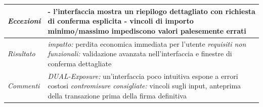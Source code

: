 \begin{longtable}{| >{\columncolor{misuseCol}}p{} | p{} |}
\hline
\textit{Eccezioni} & - l'interfaccia mostra un riepilogo dettagliato con richiesta di conferma esplicita \newline - vincoli di importo minimo/massimo impediscono valori palesemente errati \\
\hline
\textit{Risultato} & \textit{impatto:} perdita economica immediata per l'utente \newline \textit{requisiti non funzionali:} validazione avanzata nell'interfaccia e finestre di conferma dettagliate \\
\hline
\textit{Commenti} & \textit{DUAL-Exposure:} un'interfaccia poco intuitiva espone a errori costosi \newline \textit{contromisure consigliate:} vincoli sugli input, anteprima della transazione prima della firma definitiva \\
\hline
\end{longtable}

